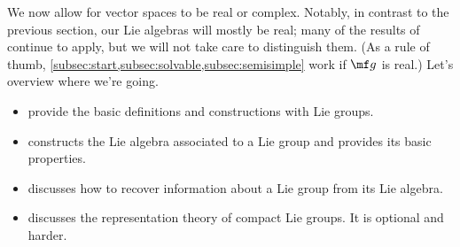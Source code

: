 \documentclass{article}
\begin{document}
We now allow for vector spaces to be real or complex. Notably, in contrast to the previous section, our Lie algebras will mostly be real; many of the results of  continue to apply, but we will not take care to distinguish them. (As a rule of thumb, \cref{subsec:start,subsec:solvable,subsec:semisimple} work if $\mf g$ is real.) Let's overview where we're going.
\begin{itemize}
	\item {} provide the basic definitions and constructions with Lie groups.
	\item {} constructs the Lie algebra associated to a Lie group and provides its basic properties.
	\item {} discusses how to recover information about a Lie group from its Lie algebra.
	\item {} discusses the representation theory of compact Lie groups. It is optional and harder.
\end{itemize}
\end{document}
